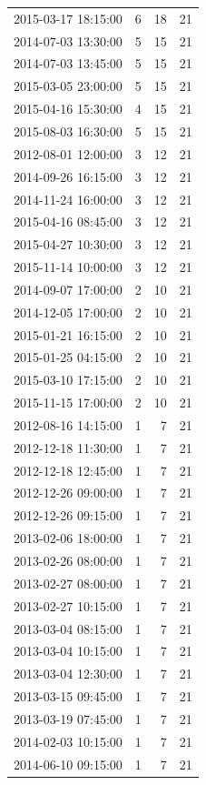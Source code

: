 \begin{tabular}{lrrr}
2015-03-17 18:15:00 & 6 & 18 & 21 \\
2014-07-03 13:30:00 & 5 & 15 & 21 \\
2014-07-03 13:45:00 & 5 & 15 & 21 \\
2015-03-05 23:00:00 & 5 & 15 & 21 \\
2015-04-16 15:30:00 & 4 & 15 & 21 \\
2015-08-03 16:30:00 & 5 & 15 & 21 \\
2012-08-01 12:00:00 & 3 & 12 & 21 \\
2014-09-26 16:15:00 & 3 & 12 & 21 \\
2014-11-24 16:00:00 & 3 & 12 & 21 \\
2015-04-16 08:45:00 & 3 & 12 & 21 \\
2015-04-27 10:30:00 & 3 & 12 & 21 \\
2015-11-14 10:00:00 & 3 & 12 & 21 \\
2014-09-07 17:00:00 & 2 & 10 & 21 \\
2014-12-05 17:00:00 & 2 & 10 & 21 \\
2015-01-21 16:15:00 & 2 & 10 & 21 \\
2015-01-25 04:15:00 & 2 & 10 & 21 \\
2015-03-10 17:15:00 & 2 & 10 & 21 \\
2015-11-15 17:00:00 & 2 & 10 & 21 \\
2012-08-16 14:15:00 & 1 & 7 & 21 \\
2012-12-18 11:30:00 & 1 & 7 & 21 \\
2012-12-18 12:45:00 & 1 & 7 & 21 \\
2012-12-26 09:00:00 & 1 & 7 & 21 \\
2012-12-26 09:15:00 & 1 & 7 & 21 \\
2013-02-06 18:00:00 & 1 & 7 & 21 \\
2013-02-26 08:00:00 & 1 & 7 & 21 \\
2013-02-27 08:00:00 & 1 & 7 & 21 \\
2013-02-27 10:15:00 & 1 & 7 & 21 \\
2013-03-04 08:15:00 & 1 & 7 & 21 \\
2013-03-04 10:15:00 & 1 & 7 & 21 \\
2013-03-04 12:30:00 & 1 & 7 & 21 \\
2013-03-15 09:45:00 & 1 & 7 & 21 \\
2013-03-19 07:45:00 & 1 & 7 & 21 \\
2014-02-03 10:15:00 & 1 & 7 & 21 \\
2014-06-10 09:15:00 & 1 & 7 & 21 \\

\end{tabular}
